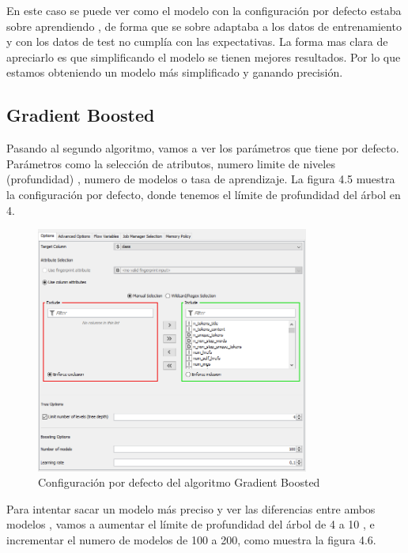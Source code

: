	En este caso se puede ver como el modelo con la configuración por defecto estaba sobre aprendiendo , de forma que se sobre adaptaba a los datos de entrenamiento y con los datos de test no cumplía con las expectativas. La forma mas clara de apreciarlo es que simplificando el modelo se tienen mejores resultados. Por lo que estamos obteniendo un modelo más simplificado y ganando precisión. 
	
	
	\subsection{Gradient Boosted}
	
	Pasando al segundo algoritmo, vamos a ver los parámetros que tiene por defecto. Parámetros como la selección de atributos, numero limite de niveles (profundidad) , numero de modelos o tasa de aprendizaje. La figura 4.5 muestra la configuración por defecto, donde tenemos el límite de profundidad del árbol en 4.
	
	\begin{figure}[htb]
		\centering
		\includegraphics[width=0.8\textwidth]{./imagenes/44}
		\caption{Configuración por defecto del algoritmo Gradient Boosted} \label{fig:1}
	\end{figure}
	
	Para intentar sacar un modelo más preciso y ver las diferencias entre ambos modelos , vamos a aumentar el límite de profundidad del árbol de 4 a 10 , e incrementar el numero de modelos de 100 a 200, como muestra la figura 4.6.
	
